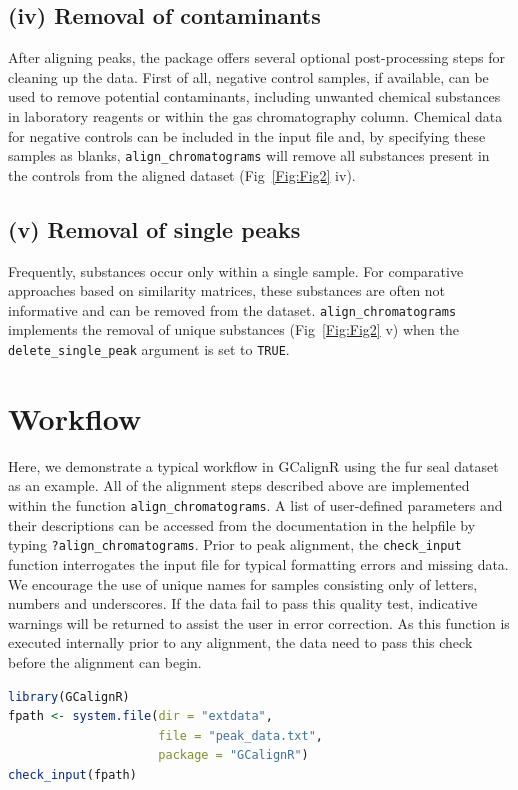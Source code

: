 \documentclass[10pt,letterpaper]{article}
\begin{document}
\subsection*{(iv) Removal of contaminants}
After aligning peaks, the package offers several optional post-processing steps for cleaning up the data. First of all, negative control samples, if available, can be used to remove potential contaminants, including unwanted chemical substances in laboratory reagents or within the gas chromatography column. Chemical data for negative controls can be included in the input file and, by specifying these samples as blanks, \texttt{align\_chromatograms} will remove all substances present in the controls from the aligned dataset (Fig~\ref{Fig:Fig2} iv).

\subsection*{(v) Removal of single peaks}
Frequently, substances occur only within a single sample. For comparative approaches based on similarity matrices, these substances are often not informative and can be removed from the dataset. \texttt{align\_chromatograms} implements the removal of unique substances (Fig~\ref{Fig:Fig2} v) when the \texttt{delete\_single\_peak} argument is set to \texttt{TRUE}.

\section*{Workflow}
Here, we demonstrate a typical workflow in GCalignR using the fur seal dataset as an example. All of the alignment steps described above are implemented within the function \texttt{align\_chromatograms}. A list of user-defined parameters and their descriptions can be accessed from the documentation in the helpfile by typing \texttt{?align\_chromatograms}. Prior to peak alignment, the \texttt{check\_input} function interrogates the input file for typical formatting errors and missing data. We encourage the use of unique names for samples consisting only of letters, numbers and underscores. If the data fail to pass this quality test, indicative warnings will be returned to assist the user in error correction. As this function is executed internally prior to any alignment, the data need to pass this check before the alignment can begin.


\begin{lstlisting}[language=R]
library(GCalignR)
fpath <- system.file(dir = "extdata",
                     file = "peak_data.txt",
                     package = "GCalignR")
check_input(fpath) 
\end{lstlisting}
\end{document}
